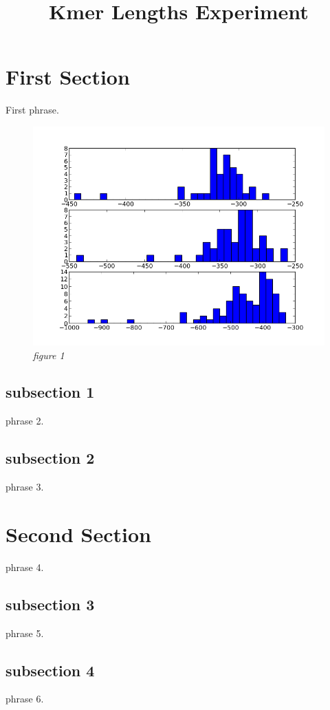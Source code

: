 \documentclass[12pt]{article}
\begin{document}
\title {Kmer Lengths Experiment}

\maketitle
\section*{First Section}
First phrase.
\begin{figure}[h!t]
  \begin{minipage}[b]{\linewidth}
    \centering
    \includegraphics[trim= 0 0 0 0, clip=true, scale=0.7]{histograms.png}
    \caption{\small{\emph{figure 1}}}
  \end{minipage}
\end{figure}
\subsection*{subsection 1}
phrase 2.
\subsection*{subsection 2}
phrase 3.

\section*{Second Section}
phrase 4.
\subsection*{subsection 3}
phrase 5.
\subsection*{subsection 4}
phrase 6.
\end{document}
